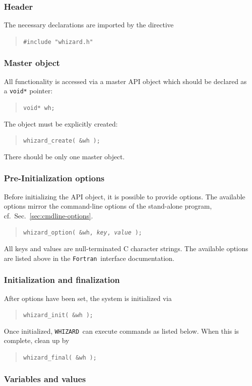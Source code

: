 \documentclass[12pt]{book}
\newcommand{\ttt}[1]{\texttt{#1}}
\newcommand{\whizard}{\ttt{WHIZARD}}
\newcommand{\fortran}{\ttt{Fortran}}
\begin{document}
\subsubsection{Header}
The necessary declarations are imported by the directive
\begin{quote}
  \tt \#include "whizard.h"
\end{quote}

\subsubsection{Master object}
All functionality is accessed via a master API object which should be declared
as a \ttt{void*} pointer:
\begin{quote}
  \tt void* wh;
\end{quote}
The object must be explicitly created:
\begin{quote}
  \tt whizard\_create( \&wh );
\end{quote}
There should be only one master object.

\subsubsection{Pre-Initialization options}
Before initializing the API object, it is possible to provide options.  The
available options mirror the command-line options of the stand-alone program,
cf.\ Sec.~\ref{sec:cmdline-options}.
\begin{quote}
  \tt  whizard\_option( \&wh, \textit{key}, \textit{value} );
\end{quote}
All keys and values are null-terminated C character strings.  The available
options are
listed above in the \fortran\ interface documentation.

\subsubsection{Initialization and finalization}
After options have been set, the system is initialized via
\begin{quote}
  \tt whizard\_init( \&wh );
\end{quote}
Once initialized, \whizard\ can execute commands as listed below.  When this
is complete, clean up by
\begin{quote}
  \tt whizard\_final( \&wh );
\end{quote}

\subsubsection{Variables and values}
\end{document}
